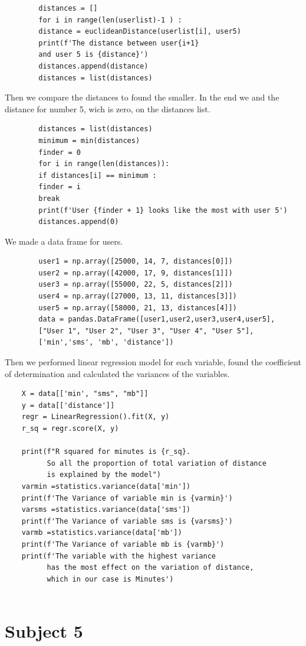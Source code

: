 \documentclass[10pt,a4paper]{article}
\begin{document}
	\begin{lstlisting}
		distances = []
		for i in range(len(userlist)-1 ) :
		distance = euclideanDistance(userlist[i], user5)
		print(f'The distance between user{i+1}
		and user 5 is {distance}')
		distances.append(distance)
		distances = list(distances)
	\end{lstlisting}
	Then we compare the distances to found the smaller. In the end we and the distance for number 5, wich is zero, on the distances list.
	\begin{lstlisting}
		distances = list(distances)
		minimum = min(distances)
		finder = 0
		for i in range(len(distances)):
		if distances[i] == minimum :
		finder = i
		break
		print(f'User {finder + 1} looks like the most with user 5')
		distances.append(0)
	\end{lstlisting}
	We made a data frame for users.
	\begin{lstlisting}
		user1 = np.array([25000, 14, 7, distances[0]])
		user2 = np.array([42000, 17, 9, distances[1]])
		user3 = np.array([55000, 22, 5, distances[2]])
		user4 = np.array([27000, 13, 11, distances[3]])
		user5 = np.array([58000, 21, 13, distances[4]])
		data = pandas.DataFrame([user1,user2,user3,user4,user5],
		["User 1", "User 2", "User 3", "User 4", "User 5"],
		['min','sms', 'mb', 'distance'])
	\end{lstlisting}
	Then we performed linear regression model for each variable, found the coefficient of determination and calculated the variances of the variables.
	\begin{lstlisting}
	X = data[['min', "sms", "mb"]]
	y = data[['distance']]
	regr = LinearRegression().fit(X, y)
	r_sq = regr.score(X, y)
	
	print(f"R squared for minutes is {r_sq}. 
		  So all the proportion of total variation of distance 
		  is explained by the model")
	varmin =statistics.variance(data['min'])
	print(f'The Variance of variable min is {varmin}')
	varsms =statistics.variance(data['sms'])
	print(f'The Variance of variable sms is {varsms}')
	varmb =statistics.variance(data['mb'])
	print(f'The Variance of variable mb is {varmb}')
	print(f'The variable with the highest variance 
		  has the most effect on the variation of distance, 
		  which in our case is Minutes')
	
	\end{lstlisting}
	
	\section{Subject 5}
	
\end{document}
